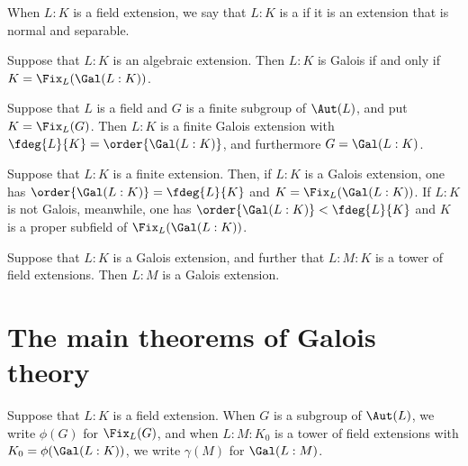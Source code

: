 \documentclass{article}
\begin{document}
  \begin{definition}
    When $ L:K $ is a field extension, we say that $ L:K $ is a  if it is an extension that is normal and separable.
  \end{definition}

  \begin{theorem}
    Suppose that $ L:K $ is an algebraic extension.
    Then $ L:K $ is Galois if and only if $ K=\Fix_L(\Gal(L:K)) $.
  \end{theorem}

  \begin{theorem}
    Suppose that $ L $ is a field and $ G $ is a finite subgroup of $ \Aut(L) $, and put $ K=\Fix_L(G) $.
    Then $ L:K $ is a finite Galois extension with $ \fdeg{L}{K}=\order{\Gal(L:K)} $, and furthermore $ G=\Gal(L:K) $.
  \end{theorem}

  \begin{theorem}
    Suppose that $ L:K $ is a finite extension.
    Then, if $ L:K $ is a Galois extension, one has $ \order{\Gal(L:K)}=\fdeg{L}{K} $ and $ K=\Fix_L(\Gal(L:K)) $.
    If $ L:K $ is not Galois, meanwhile, one has $ \order{\Gal(L:K)}<\fdeg{L}{K} $ and $ K $ is a proper subfield of $ \Fix_L(\Gal(L:K)) $.
  \end{theorem}

  \begin{proposition}
    Suppose that $ L:K $ is a Galois extension, and further that $ L:M:K $ is a tower of field extensions.
    Then $ L:M $ is a Galois extension.
  \end{proposition}

\section{The main theorems of Galois theory}
  \begin{definition}
    Suppose that $ L:K $ is a field extension.
    When $ G $ is a subgroup of $ \Aut(L) $, we write $ \phi(G) $ for $ \Fix_L(G) $, and when $ L:M:K_0 $ is a tower of field extensions with $ K_0=\phi(\Gal(L:K)) $, we write $ \gamma(M) $ for $ \Gal(L:M) $.
  \end{definition}
\end{document}
